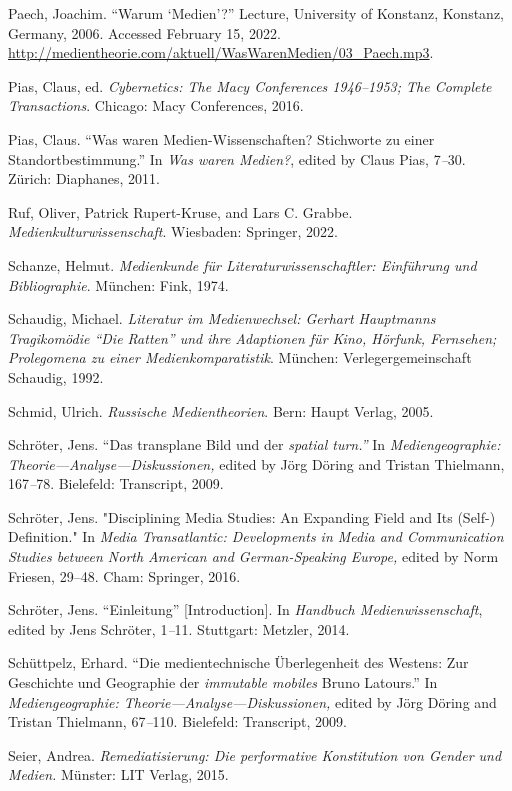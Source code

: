 \documentclass{tufte-handout}
\begin{document}
\begin{hangparas}{.25in}{1}
Paech, Joachim. ``Warum `Medien'?'' Lecture, University of Konstanz,
Konstanz, Germany, 2006. Accessed February 15, 2022.
\url{http://medientheorie.com/aktuell/WasWarenMedien/03_Paech.mp3}.

Pias, Claus, ed. \emph{Cybernetics: The Macy Conferences 1946--1953; The
Complete Transactions}. Chicago: Macy Conferences, 2016.

Pias, Claus. ``Was waren Medien-Wissenschaften? Stichworte zu einer
Standortbestimmung.'' In \emph{Was waren Medien?}, edited by Claus Pias,
7\emph{--}30. Zürich: Diaphanes, 2011.

Ruf, Oliver, Patrick Rupert-Kruse, and Lars C. Grabbe.
\emph{Medienkulturwissenschaft}. Wiesbaden: Springer, 2022.

Schanze, Helmut. \emph{Medienkunde für Literaturwissenschaftler:
Einführung und Bibliographie}. München: Fink, 1974.

Schaudig, Michael. \emph{Literatur im Medienwechsel: Gerhart Hauptmanns
Tragikomödie ``Die Ratten'' und ihre Adaptionen für Kino, Hörfunk,
Fernsehen; Prolegomena zu einer Medienkomparatistik}. München:
Verlegergemeinschaft Schaudig, 1992.

Schmid, Ulrich. \emph{Russische Medientheorien}. Bern: Haupt Verlag,
2005.

Schröter, Jens. ``Das transplane Bild und der \emph{spatial turn.''} In
\emph{Mediengeographie: Theorie---Analyse---Diskussionen,} edited by
Jörg Döring and Tristan Thielmann, 167\emph{--}78. Bielefeld:
Transcript, 2009.

Schröter, Jens. "Disciplining Media Studies: An Expanding Field and Its
(Self-) Definition." In \emph{Media Transatlantic: Developments in Media
and Communication Studies between North American and German-Speaking
Europe,} edited by Norm Friesen, 29--48. Cham: Springer, 2016.

Schröter, Jens. ``Einleitung'' {[}Introduction{]}. In \emph{Handbuch
Medienwissenschaft}, edited by Jens Schröter, 1\emph{--}11. Stuttgart:
Metzler, 2014.

Schüttpelz, Erhard. ``Die medientechnische Überlegenheit des Westens:
Zur Geschichte und Geographie der \emph{immutable mobiles} Bruno
Latours.'' In \emph{Mediengeographie: Theorie---Analyse---Diskussionen,}
edited by Jörg Döring and Tristan Thielmann, 67\emph{--}110. Bielefeld:
Transcript, 2009.

Seier, Andrea. \emph{Remediatisierung: Die performative Konstitution von
Gender und Medien.} Münster: LIT Verlag, 2015.


\end{hangparas}
\end{document}
